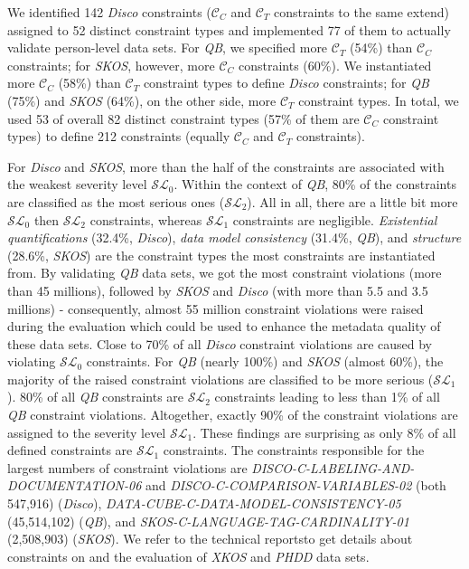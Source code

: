\documentclass{llncs}
\newcommand{\tb}[1]{\todo[size=\small, color=green!40]{\textbf{Thomas:} #1}}
\begin{document}
{We identified 142 \emph{Disco} constraints ($\mathcal{C}_{C}$ and $\mathcal{C}_{T}$ constraints to the same extend) assigned to 52 distinct constraint types and implemented 77 of them to actually validate person-level data sets.  
For \emph{QB}, we specified more $\mathcal{C}_{T}$ (54\%) than $\mathcal{C}_{C}$ constraints; for \emph{SKOS}, however, more $\mathcal{C}_{C}$ constraints (60\%).
We instantiated more $\mathcal{C}_{C}$ (58\%) than $\mathcal{C}_{T}$ constraint types to define \emph{Disco} constraints; 
for \emph{QB} (75\%) and \emph{SKOS} (64\%), on the other side, more $\mathcal{C}_{T}$ constraint types. 
In total, we used 53 of overall 82 distinct constraint types (57\% of them are $\mathcal{C}_{C}$ constraint types) to define 212 constraints (equally $\mathcal{C}_{C}$ and $\mathcal{C}_{T}$ constraints).

For \emph{Disco} and \emph{SKOS}, more than the half of the constraints are associated with the weakest severity level $\mathcal{SL}_{0}$.
Within the context of \emph{QB}, 80\% of the constraints are classified as the most serious ones ($\mathcal{SL}_{2}$).
All in all, there are a little bit more $\mathcal{SL}_{0}$ then $\mathcal{SL}_{2}$ constraints, whereas $\mathcal{SL}_{1}$ constraints are negligible.
\emph{Existential quantifications} (32.4\%, \emph{Disco}), \emph{data model consistency} (31.4\%, \emph{QB}), and \emph{structure} (28.6\%, \emph{SKOS}) are the constraint types the most constraints are instantiated from.
By validating \emph{QB} data sets, we got the most constraint violations (more than 45 millions), followed by \emph{SKOS} and \emph{Disco} (with more than 5.5 and 3.5 millions) - consequently, almost 55 million constraint violations were raised during the evaluation which could be used to enhance the metadata quality of these data sets.  
Close to 70\% of all \emph{Disco} constraint violations are caused by violating $\mathcal{SL}_{0}$ constraints.
For \emph{QB} (nearly 100\%) and \emph{SKOS} (almost 60\%), the majority of the raised constraint violations are classified to be more serious ($\mathcal{SL}_{1}$).
80\% of all \emph{QB} constraints are $\mathcal{SL}_{2}$ constraints leading to less than 1\% of all \emph{QB} constraint violations.
Altogether, exactly 90\% of the constraint violations are assigned to the severity level $\mathcal{SL}_{1}$.
These findings are surprising as only 8\% of all defined constraints are $\mathcal{SL}_{1}$ constraints.
The constraints responsible for the largest numbers of constraint violations are \emph{DISCO-C-LABELING-AND-DOCUMENTATION-06} and \emph{DISCO-C-COMPARISON-VARIABLES-02} (both 547,916) (\emph{Disco}), \emph{DATA-CUBE-C-DATA-MODEL-CONSISTENCY-05} (45,514,102) (\emph{QB}), and \emph{SKOS-C-LANGUAGE-TAG-CARDINALITY-01} (2,508,903) (\emph{SKOS})\tb{kurz beschreiben}.
We refer to the technical reports\footnotemark[\ref{technical-report-1}] \footnotemark[\ref{technical-report-2}] to get details about constraints on and the evaluation of \emph{XKOS} and \emph{PHDD} data sets.

}
\end{document}
